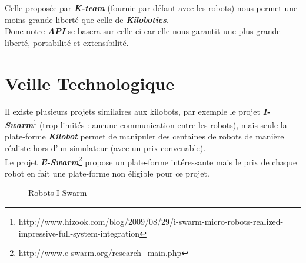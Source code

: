 \documentclass[a4paper,8pt]{report}
\begin{document}
\medskip
Celle propos\'ee par \textit{\textbf{K-team}} (fournie par d\'efaut avec les robots) nous permet une moins grande libert\'e que celle de \textit{\textbf{Kilobotics}}.\\
Donc notre \textit{\textbf{API}} se basera sur celle-ci car elle nous garantit une plus grande libert\'e, portabilit\'e et extensibilit\'e.

\section*{Veille Technologique}\label{sec:name}

Il existe plusieurs projets similaires aux kilobots, par exemple le projet \textit{\textbf{I-Swarm}}\footnote{http://www.hizook.com/blog/2009/08/29/i-swarm-micro-robots-realized-impressive-full-system-integration} (trop limités : aucune communication entre les robots), mais seule la plate-forme \textit{\textbf{Kilobot}} permet de manipuler des centaines de robots de mani\`ere r\'ealiste hors d'un simulateur (avec un prix convenable).\\
Le projet \textit{\textbf{E-Swarm}}\footnote{http://www.e-swarm.org/research_main.php} propose un plate-forme int\'eressante mais le prix de chaque robot en fait une plate-forme non \'eligible pour ce projet.\\

\begin{figure}[!h]
    \centering
    \caption{Robots I-Swarm}
\end{figure}
\end{document}

